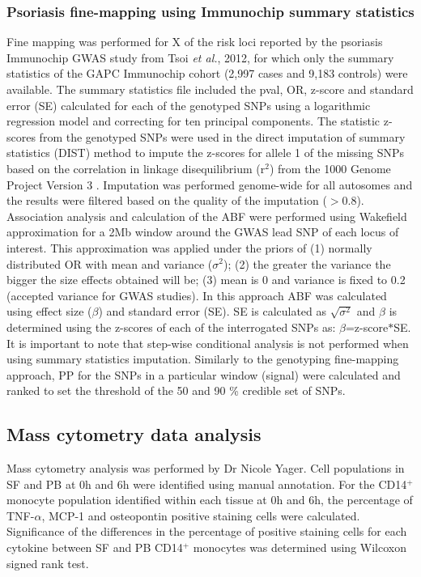 \subsubsection{Psoriasis fine-mapping using Immunochip summary statistics}
Fine mapping was performed for X of the risk loci reported by the psoriasis Immunochip GWAS study from Tsoi \textit{et al.}, 2012, for which only the summary statistics of the GAPC Immunochip cohort (2,997 cases and 9,183 controls) were available. The summary statistics file included the pval, OR, z-score and standard error (SE) calculated for each of the genotyped SNPs using a logarithmic regression model and correcting for ten principal components. The statistic z-scores from the genotyped SNPs were used in the direct imputation of summary statistics (DIST) method to impute the z-scores for allele 1 of the missing SNPs based on the correlation in linkage disequilibrium (r$^2$) from the 1000 Genome Project Version 3 \parencite{Lee2013}. Imputation was performed genome-wide for all autosomes and the results were filtered based on the quality of the imputation ($>$0.8). Association analysis and calculation of the ABF were performed using Wakefield approximation for a 2Mb window around the GWAS lead SNP of each locus of interest. This approximation was applied under the priors of (1) normally distributed OR with mean and variance ($\sigma^2$); (2) the greater the variance the bigger the size effects obtained will be; (3) mean is 0 and variance is fixed to 0.2 (accepted variance for GWAS studies). In this approach ABF was calculated using effect size ($\beta$) and standard error (SE). SE is calculated as $\sqrt{\sigma^2}$ and $\beta$ is determined using the z-scores of each of the interrogated SNPs as: $\beta$=z-score$\ast$SE. It is important to note that step-wise conditional analysis is not performed when using summary statistics imputation. Similarly to the genotyping fine-mapping approach, PP for the SNPs in a particular window (signal) were calculated and ranked to set the threshold of the 50 and 90 \% credible set of SNPs. 

\subsection{Mass cytometry data analysis}
Mass cytometry analysis was performed by Dr Nicole Yager. Cell populations in SF and PB at 0h and 6h were identified using manual annotation. For the CD14$^+$ monocyte population identified within each tissue at 0h and 6h, the percentage of TNF-$\alpha$, MCP-1 and osteopontin positive staining cells were calculated. Significance of the differences in the percentage of positive staining cells for each cytokine between SF and PB CD14$^+$ monocytes was determined using Wilcoxon signed rank test.  

